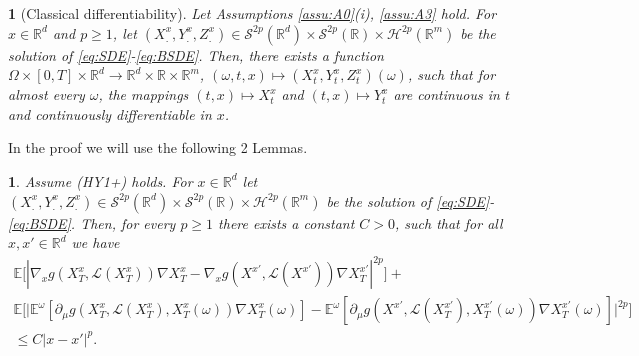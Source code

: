 \documentclass[12,english]{amsart}
\theoremstyle{plain}
\newtheorem{thm}{\protect\theoremname}
\newtheorem{lem}{\protect\lemmaname}
\theoremstyle{definition}
\theoremstyle{plain}
\theoremstyle{plain}
\theoremstyle{remark}
\providecommand{\theoremname}{Theorem}
\providecommand{\lemmaname}{Lemma}
\newcommand{\E}{\mathbb E}
\newcommand{\R}{\mathbb R}
\newcommand{\cH}{\mathcal H}
\newcommand{\cL}{\mathcal L}
\newcommand{\cS}{\mathcal S}
\newcommand{\om}{\omega}
\begin{document}
\begin{thm}
  [Classical differentiability]\label{TFBSDE2}
  Let Assumptions \ref{assu:A0}(i),  \ref{assu:A3} hold.
  For $x\in\R^d$
  and $p\geq1$, let $(X^x_.,Y^x_.,Z^x_.)\in\cS^{2p}(\R^d)\times\cS^{2p}(\R)\times\cH^{2p}(\R^m)$
be the solution of \eqref{eq:SDE}-\eqref{eq:BSDE}. Then, there exists a function
$\Omega\times\left[0,T\right]\times\R^d\to\R^d\times\R\times\R^m$,
$(\omega,t,x)\mapsto(X^x_t,Y^x_t,Z^x_t)(\omega)$,
 such that for almost every $\omega$, the mappings $(t,x)\mapsto X_t^x$
and $(t,x)\mapsto Y_t^x$ are continuous in $t$ and
continuously differentiable in $x$.
\end{thm}

In the proof we will use the following 2 Lemmas.  
\begin{lem}\label{terminal}
  Assume (HY1+) holds. For $x\in\R^d$
let $(X^x_.,Y^x_.,Z^x_.)\in\cS^{2p}(\R^d)\times\cS^{2p}(\R)\times\cH^{2p}(\R^m)$
be the solution of \eqref{eq:SDE}-\eqref{eq:BSDE}. Then, for every
$p\ge 1$ there
exists a constant $C>0$, such that for all $x,x'\in\R^d$ we have
\begin{multline*}
  \E\Big[|\nabla_xg(X^x_T,\cL(X^x_T)) \nabla X^x_T
    -\nabla_xg(X^{x'},\cL(X^{x'})) \nabla X^{x'}_T|^{2p} \Big]+\\
\E\Big[\big|\E^\om[\partial_\mu g(X^x_T,\cL(X^x_T), X^x_T(\om))\nabla X^x_T(\om)]
  -\E^\om[\partial_\mu g(X^{x'},\cL(X^{x'}_T), X^{x'}_T(\om)) \nabla X^{x'}_T(\om)]\big|^{2p}\Big]\\\le
C|x-x'|^p.
\end{multline*}
\end{lem}
\end{document}
